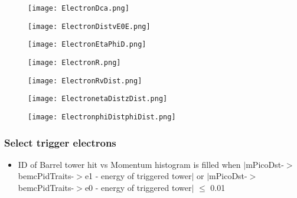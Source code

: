\documentclass{beamer}
\begin{document}
\begin{frame}
  \begin{figure}[h!]
  \centering
  \texttt{[image: ElectronDca.png]}
  \end{figure}
\end{frame}

\begin{frame}
  \begin{figure}[h!]
  \centering
  \texttt{[image: ElectronDistvE0E.png]}
  \end{figure}
\end{frame}

\begin{frame}
  \begin{figure}[h!]
  \centering
  \texttt{[image: ElectronEtaPhiD.png]}
  \end{figure}
\end{frame}

\begin{frame}
  \begin{figure}[h!]
  \centering
  \texttt{[image: ElectronR.png]}
  \end{figure}
\end{frame}

\begin{frame}
  \begin{figure}[h!]
  \centering
  \texttt{[image: ElectronRvDist.png]}
  \end{figure}
\end{frame}

\begin{frame}
  \begin{figure}[h!]
  \centering
  \texttt{[image: ElectronetaDistzDist.png]}
  \end{figure}
\end{frame}

\begin{frame}
  \begin{figure}[h!]
  \centering
  \texttt{[image: ElectronphiDistphiDist.png]}
  \end{figure}
\end{frame}

\begin{frame}
  \frametitle{Select trigger electrons}
  \begin{itemize}
    \item ID of Barrel tower hit vs Momentum histogram is filled when $|$mPicoDst-$>$bemcPidTraits-$>$e1 - energy of triggered tower$|$  or $|$mPicoDst-$>$bemcPidTraits-$>$e0 - energy of triggered tower$|$ $\leq$ 0.01 
  \end{itemize}
\end{frame}
\end{document}
